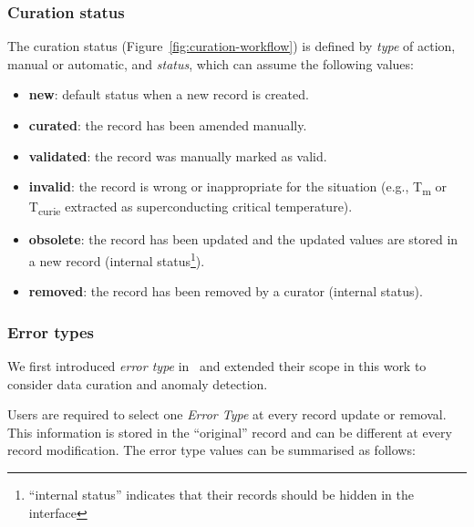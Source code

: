 \subsubsection{Curation status} 
\label{subsec:curation-status}
The curation status (Figure~\ref{fig:curation-workflow}) is defined by \emph{type} of action, manual or automatic, and \emph{status}, which can assume the following values: 
\begin{itemize}
    \item \textbf{new}: default status when a new record is created.
    \item \textbf{curated}: the record has been amended manually.
    \item \textbf{validated}: the record was manually marked as valid.
    \item \textbf{invalid}: the record is wrong or inappropriate for the situation (e.g., T\textsubscript{m} or T\textsubscript{curie} extracted as superconducting critical temperature).
    \item \textbf{obsolete}: the record has been updated and the updated values are stored in a new record (internal status\footnote{``internal status'' indicates that their records should be hidden in the interface}).
    \item \textbf{removed}: the record has been removed by a curator (internal status).
\end{itemize} 
    

\subsubsection{Error types}
\label{subsec:error-types}
We first introduced \emph{error type} in~\cite{foppiano2023automatic} and extended their scope in this work to consider data curation and anomaly detection. 

Users are required to select one \emph{Error Type} at every record update or removal. This information is stored in the ``original'' record and can be different at every record modification.
The error type values can be summarised as follows: 

